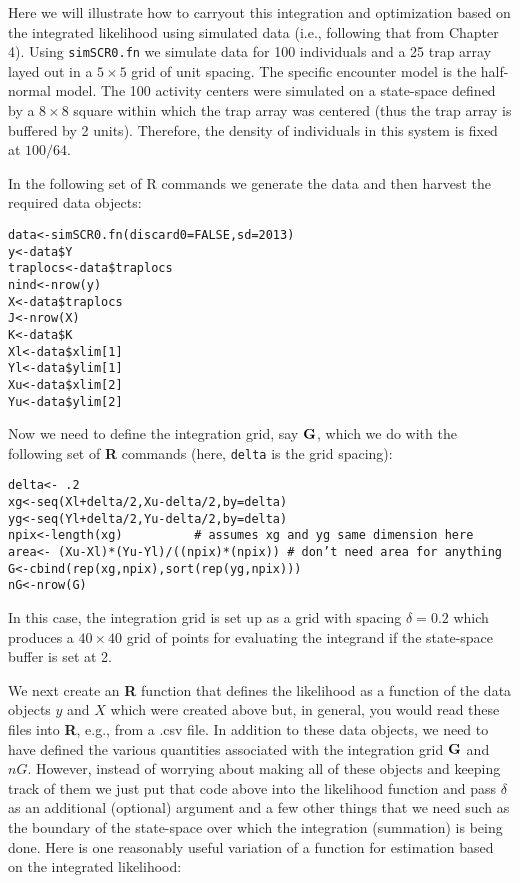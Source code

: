 Here we will illustrate how to carryout this integration and
optimization based on the integrated likelihood using simulated data
 (i.e., following that from Chapter 4). Using \mbox{\tt simSCR0.fn}
 we simulate data for 100 individuals and a 25 trap array
layed out in a $5 \times 5$ grid of unit spacing.  The specific encounter
model is the half-normal model. The 100 activity centers were
simulated on a state-space defined by a $8 \times 8$ square 
within which the
trap array was centered (thus the trap array is buffered by 2
units). Therefore, the density of individuals in this system is fixed
at $100/64$.

In the following set of R commands we generate the data and 
then harvest the required data objects:
\begin{verbatim}
data<-simSCR0.fn(discard0=FALSE,sd=2013)
y<-data$Y
traplocs<-data$traplocs
nind<-nrow(y)
X<-data$traplocs
J<-nrow(X)
K<-data$K
Xl<-data$xlim[1]
Yl<-data$ylim[1]
Xu<-data$xlim[2]
Yu<-data$ylim[2]
\end{verbatim}
Now we need to define the integration grid, say ${\bf G}$, which we do with
the following set of {\bf R} commands (here, \mbox{\tt delta} is the grid spacing):
\begin{verbatim}
delta<- .2
xg<-seq(Xl+delta/2,Xu-delta/2,by=delta) 
yg<-seq(Yl+delta/2,Yu-delta/2,by=delta) 
npix<-length(xg)          # assumes xg and yg same dimension here
area<- (Xu-Xl)*(Yu-Yl)/((npix)*(npix)) # don’t need area for anything
G<-cbind(rep(xg,npix),sort(rep(yg,npix)))
nG<-nrow(G)
\end{verbatim}
In this case, the integration grid is set up as a grid with spacing
$\delta = 0.2$ which produces a $40 \times 40$ grid of points for evaluating the
integrand if the state-space buffer is set at 2.

We next create an {\bf R} function that defines the likelihood as a function
of the data objects $y$ and $X$ which were created above but, in general,
you would read these files into {\bf R}, e.g., from a .csv file.
In addition to these data
objects, we need to have defined the various quantities associated
with the integration grid ${\bf G}$ and $nG$.
However, instead of worrying about making all of these objects and
keeping track of them we just put that code above into the likelihood
function and pass $\delta$ as an additional (optional) argument and a
few other things that we need such as the boundary of the state-space
over which the integration (summation) is being done.
Here is one reasonably useful variation of a function for estimation
based on the integrated likelihood:

